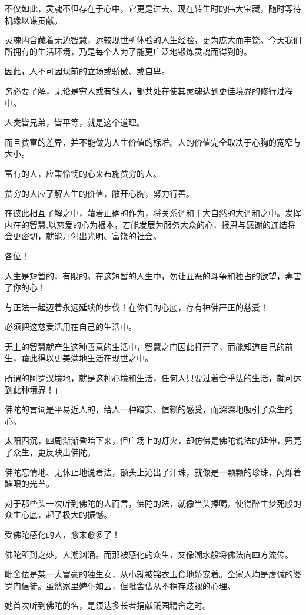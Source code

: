 \documentclass[twoside,openany]{book}
\begin{document}
不仅如此，灵魂不但存在于心中，它更是过去、现在转生时的伟大宝藏，随时等待机缘以谋贡献。

灵魂内含藏着无边智慧，远较现世所体验的人生经验，更为庞大而丰饶。今天我们所拥有的生活环境，乃是每个人为了能更广泛地锻炼灵魂而得到的。

因此，人不可因现前的立场或骄傲、或自卑。

务必要了解，无论是穷人或有钱人，都共处在使其灵魂达到更佳境界的修行过程中。

人类皆兄弟，皆平等，就是这个道理。

而且贫富的差异，并不能做为人生价值的标准。人的价值完全取决于心胸的宽窄与大小。

富有的人，应秉怜悯的心来布施贫穷的人。

贫穷的人应了解人生的价值，敞开心胸，努力行善。

在彼此相互了解之中，藉着正确的作为，将关系调和于大自然的大调和之中。发挥内在的智慧,以慈爱的心为根本，若能发展为服务大众的心，报恩与感谢的连结将会更密切，就能开创出光明、富饶的社会。

各位！

人生是短暂的，有限的。在这短暂的人生中，勿让丑恶的斗争和独占的欲望，毒害了你的心！

与正法一起迈着永远延续的步伐！在你们的心底，存有神佛严正的慈爱！

必须把这慈爱活用在自己的生活中。

无上的智慧就产生这种善意的生活中，智慧之门因此打开了，而能知道自己的前生，藉此得以更美满地生活在现世之中。

所谓的阿罗汉境地，就是这种心境和生活，任何人只要过着合乎法的生活，就可达到此种境界！」

佛陀的言词是平易近人的，给人一种踏实、信赖的感受，而深深地吸引了众生的心。

太阳西沉，四周渐渐昏暗下来，但广场上的灯火，却仿佛是佛陀说法的延伸，照亮了众生，更反映出佛陀。

佛陀忘情地、无休止地说着法，额头上沁出了汗珠，就像是一颗颗的珍珠，闪烁着耀眼的光芒。

对于那些头一次听到佛陀的人而言，佛陀的法，就像当头捧喝，使得醉生梦死般的众生心底，起了极大的振憾。

受佛陀感化的人，愈来愈多了！

佛陀所到之处，人潮汹涌。而那被感化的众生，又像潮水般将佛法向四方流传。

毗舍佉是某一大富豪的独生女，从小就被锦衣玉食地娇宠着。全家人均是虔诚的婆罗门信徒。虽然家里婢仆如云，但毗舍佉从不稍存歧视的心理。

她首次听到佛陀的名，是须达多长者捐献祇园精舍之时。
\end{document}
